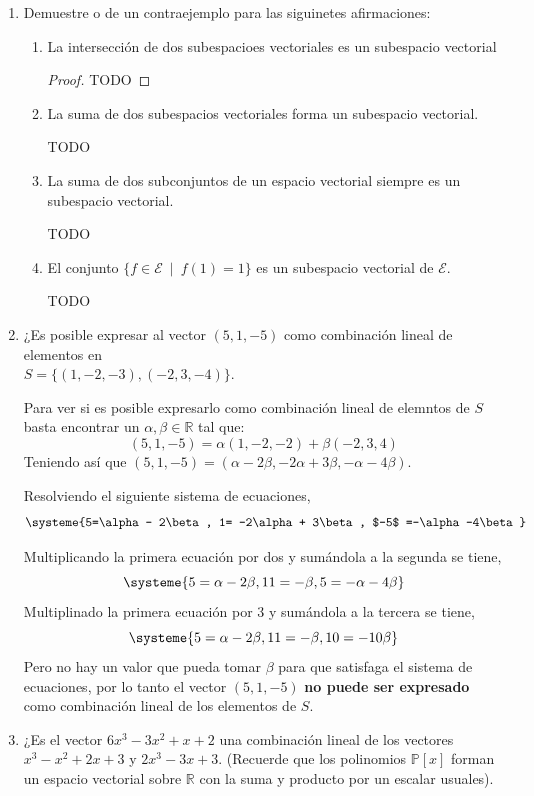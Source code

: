 \documentclass[11pt,letterpaper]{article}
\newcommand{\R}{\mathbb{R}}
\begin{document}
\begin{enumerate}
\item Demuestre o de un contraejemplo para las siguinetes afirmaciones:
\begin{enumerate}[label=(\alph*)]
    \item La intersección de dos subespacioes vectoriales es un subespacio vectorial
    \begin{proof}
        TODO
    \end{proof}

    \item La suma de dos subespacios vectoriales forma un subespacio vectorial.
    
    TODO

    \item La suma de dos subconjuntos de un espacio vectorial siempre es un subespacio vectorial.
    
    TODO

    \item El conjunto $\{f \in \mathscr{E} \ \mid \ f (1) = 1 \}$ es un subespacio vectorial de $\mathscr{E}$.
    
    TODO

\end{enumerate}

\item ¿Es posible expresar al vector $(5,1,-5)$ como combinación lineal de elementos en\\
$S = \{(1, -2, -3), (-2, 3, -4)\}$.

Para ver si es posible expresarlo como combinación lineal de elemntos de $S$ basta
encontrar un $\alpha, \beta \in \R$ tal que:
\[ (5,1,-5) = \alpha(1,-2,-2) + \beta(-2,3,4) \]
Teniendo así que $(5,1,-5) = (\alpha - 2\beta, -2\alpha + 3\beta, -\alpha-4\beta)$.

Resolviendo el siguiente sistema de ecuaciones,
\[
\systeme{5=\alpha - 2\beta,
        1= -2\alpha + 3\beta,
        $-5$ =-\alpha-4\beta}
\]

Multiplicando la primera ecuación por dos y sumándola a la segunda se tiene,
\[
\systeme{5=\alpha - 2\beta,
        11= -\beta,
        5 =-\alpha-4\beta}
\]
Multiplinado la primera ecuación por 3 y sumándola a la tercera se tiene,
\[
\systeme{5=\alpha - 2\beta,
        11= -\beta,
        10 =-10\beta}
\]
Pero no hay un valor que pueda tomar $\beta$ para que satisfaga el sistema de ecuaciones,
por lo tanto el vector $(5,1,-5)$ \textbf{no puede ser expresado} como combinación lineal
de los elementos de $S$.

\item ¿Es el vector $6x^3 - 3x^2 + x + 2$ una combinación lineal de los vectores
$x^3 -x^2 +2x + 3$ y $2x^3 -3x+3$. (Recuerde que los polinomios $\mathds{P}[x]$ forman un
espacio vectorial sobre $\R$ con la suma y producto por un escalar usuales).


\end{enumerate}
\end{document}
